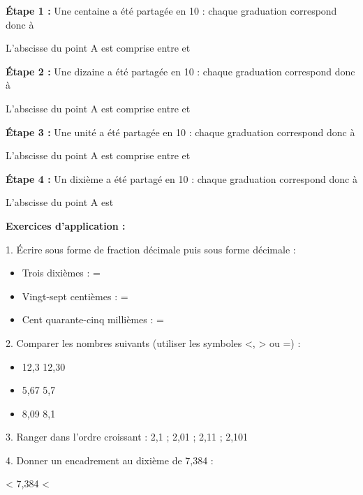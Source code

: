 \begin{examplebox}
	\textbf{Étape 1 :} Une centaine a été partagée en 10 : chaque graduation correspond donc à \trous{4cm}
	
	L'abscisse du point A est comprise entre \trous{3cm} et \trous{3cm}
	
	\textbf{Étape 2 :} Une dizaine a été partagée en 10 : chaque graduation correspond donc à \trous{4cm}
	
	L'abscisse du point A est comprise entre \trous{3cm} et \trous{3cm}
	
	\textbf{Étape 3 :} Une unité a été partagée en 10 : chaque graduation correspond donc à \trous{4cm}
	
	L'abscisse du point A est comprise entre \trous{3cm} et \trous{3cm}
	
	\textbf{Étape 4 :} Un dixième a été partagé en 10 : chaque graduation correspond donc à \trous{4cm}
	
	L'abscisse du point A est \trous{3cm}
\end{examplebox}

\vspace{2cm}

\textbf{Exercices d'application :}

\begin{exercisebox}
	1. Écrire sous forme de fraction décimale puis sous forme décimale :
	\begin{itemize}
		\item Trois dixièmes : \trous{3cm} = \trous{2cm}
		\item Vingt-sept centièmes : \trous{3cm} = \trous{2cm}
		\item Cent quarante-cinq millièmes : \trous{3cm} = \trous{2cm}
	\end{itemize}
	
	2. Comparer les nombres suivants (utiliser les symboles <, > ou =) :
	\begin{itemize}
		\item 12,3 \trous{1cm} 12,30
		\item 5,67 \trous{1cm} 5,7
		\item 8,09 \trous{1cm} 8,1
	\end{itemize}
	
	3. Ranger dans l'ordre croissant : 2,1 ; 2,01 ; 2,11 ; 2,101
	
	\trous{8cm}
	
	4. Donner un encadrement au dixième de 7,384 :
	
	\trous{5cm} < 7,384 < \trous{5cm}
\end{exercisebox}